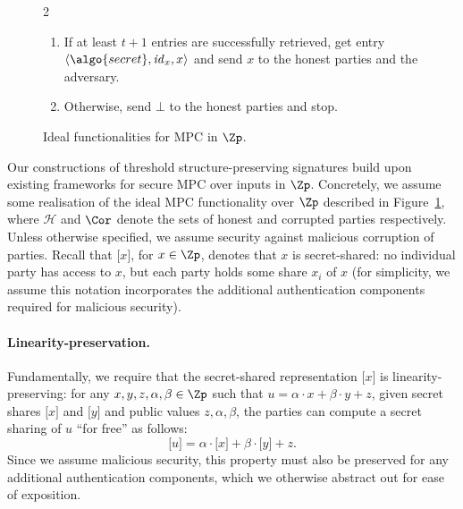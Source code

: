 \begin{figure}
\begin{minipage}{1.1\textwidth}
\begin{framed}
\begin{multicols}{2}
\begin{enumerate}
          \item If at least $t+1$ entries are successfully retrieved, get entry
            $\langle \algo{secret}, \mathit{id}_x, x\rangle$ and send $x$ to
            the honest parties and the adversary.

          \item Otherwise, send $\bot$ to the honest parties and stop.

        \end{enumerate}

      \end{multicols}

    \end{framed}

  \end{minipage} \caption{Ideal functionalities for MPC in $\Zp$.}
\label{fig:ideal-func} \end{figure}

Our constructions of threshold structure-preserving signatures build upon
existing frameworks for secure MPC over inputs in $\Zp$. Concretely, we assume
some realisation of the ideal MPC functionality over $\Zp$ described in
Figure~\ref{fig:ideal-func}, where $\mathcal{H}$ and $\Cor$ denote the sets of
honest and corrupted parties respectively. Unless otherwise specified, we
assume security against malicious corruption of parties. Recall that $\lbrack x
\rbrack $, for $x \in \Zp$, denotes that $x$ is secret-shared: no individual
party has access to $x$, but each party holds some share $x_i$ of $x$ (for
simplicity, we assume this notation incorporates the additional authentication
components required for malicious security).

\paragraph{Linearity-preservation.} Fundamentally, we require that the
secret-shared representation $\lbrack x\rbrack $ is linearity-preserving: for
any $x,y,z,\alpha,\beta\in \Zp$ such that $u = \alpha\cdot x + \beta \cdot y +
z$, given secret shares $\lbrack x\rbrack $ and $\lbrack y\rbrack $ and public
values $z,\alpha,\beta$, the parties can compute a secret sharing of $u$ ``for
free'' as follows: \[\lbrack u\rbrack = \alpha\cdot \lbrack x\rbrack + \beta
  \cdot \lbrack y\rbrack + z.\] Since we assume malicious security, this
  property must also be preserved for any additional authentication components,
  which we otherwise abstract out for ease of exposition.

